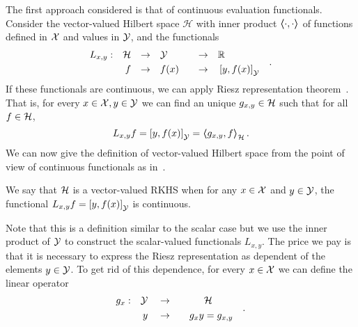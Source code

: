 The first approach considered is that of continuous evaluation functionals.
Consider the vector-valued Hilbert space $\mathcal{H}$ with inner product $\bm{\left\langle} \cdot, \cdot \bm{\right\rangle}$ of functions defined in $\mathcal{X}$ and values in $\mathcal{Y}$, and the functionals
\begin{equation*}
    \begin{aligned}
        L_{x, y}: &  & \mathcal{H} &  & \to &  &  & \mathcal{Y} &  &  & \to &  &  & \mathbb{R}          &  & \\
                  &  & f             &  & \to &  &  & f(x)    &  &  & \to &  &  & \left[ y, f(x) \right]_\mathcal{Y} &  &
    \end{aligned}.
\end{equation*}
If these functionals are continuous, we can apply Riesz representation theorem~\citep{riesz2012functional}. That is, for every $x \in \mathcal{X}, y \in \mathcal{Y}$ we can find an unique $g_{x, y} \in \mathcal{H}$ such that for all $f \in \mathcal{H}$,
\begin{equation}\label{eq:vector_riesz}
    L_{x, y} f = \ydotp{y}{f(x)} = \dotp{g_{x,y}}{f}_{\hilbertspace} .
\end{equation}
We can now give the definition of vector-valued Hilbert space from the point of view of continuous functionals as in~\citet[Definition 2.1]{MicchelliP05}.
\begin{definition}
    We say that $\mathcal{H}$ is a vector-valued RKHS when for any $x \in \mathcal{X}$ and $y \in \mathcal{Y}$, the functional $L_{x, y} f = \left[ y, f(x) \right]_\mathcal{Y}$ is continuous.
\end{definition}
Note that this is a definition similar to the scalar case but we use the inner product of $\mathcal{Y}$ to construct the scalar-valued functionals $L_{x, y}$. The price we pay is that it is necessary to express the Riesz representation as dependent of the elements $y \in \mathcal{Y}$. To get rid of this dependence, for every $x \in \mathcal{X}$ we can define the linear operator
\begin{equation}
    \label{eq:vector_riesz}
    \begin{aligned}
        g_x: &  & \Yspace &  &  & \to &  &  &       & \hilbertspace &  & \\
             &  & y       &  &  & \to &  &  & g_x y & = g_{x, y}    &  &
    \end{aligned}.
\end{equation}
